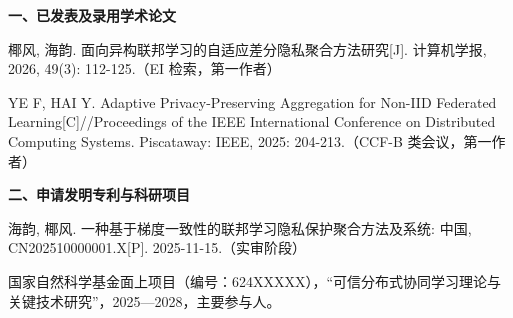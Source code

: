
\begin{achievements}
\noindent\textbf{一、已发表及录用学术论文}
\begin{enumerate}[label={[\arabic*]}, leftmargin=2.2em, itemsep=4pt]
  \item 椰风, 海韵. 面向异构联邦学习的自适应差分隐私聚合方法研究[J]. 计算机学报, 2026, 49(3): 112-125.（EI 检索，第一作者）
  \item YE F, HAI Y. Adaptive Privacy-Preserving Aggregation for Non-IID Federated Learning[C]//Proceedings of the IEEE International Conference on Distributed Computing Systems. Piscataway: IEEE, 2025: 204-213.（CCF-B 类会议，第一作者）
\end{enumerate}

\vspace{0.6\baselineskip}
\noindent\textbf{二、申请发明专利与科研项目}
\begin{enumerate}[label={[\arabic*]}, leftmargin=2.2em, itemsep=4pt]
  \item 海韵, 椰风. 一种基于梯度一致性的联邦学习隐私保护聚合方法及系统: 中国, CN202510000001.X[P]. 2025-11-15.（实审阶段）
  \item 国家自然科学基金面上项目（编号：624XXXXX），“可信分布式协同学习理论与关键技术研究”，2025—2028，主要参与人。
\end{enumerate}
\end{achievements}
